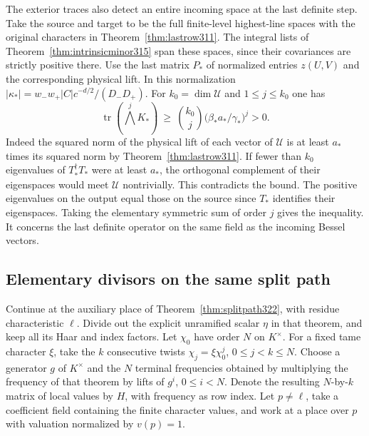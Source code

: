 \documentclass[a4paper,11pt]{article}
\theoremstyle{definition}
\theoremstyle{remark}
\numberwithin{equation}{section}
\begin{document}
The exterior traces also detect an entire incoming space at
the last definite step. Take the source and target to be the
full finite-level highest-line spaces with the original
characters in Theorem~\ref{thm:lastrow311}. The integral
lists of Theorem~\ref{thm:intrinsicminor315} span these
spaces, since their covariances are strictly positive there.
Use the last matrix \(P_*\) of normalized entries \(z(U,V)\)
and the corresponding physical lift. In this normalization
\(|\kappa_*|=w_-w_+|C|c^{-d/2}/(D_-D_+)\). For
\(k_0=\dim\mathcal U\) and \(1\le j\le k_0\) one has
\[
 \operatorname{tr}(\textstyle\bigwedge^j K_*)\ \ge\
        {k_0\choose j}\bigl(\beta_*a_*/\gamma_*\bigr)^j>0 .
\]
Indeed the squared norm of the physical lift of each vector
of \(\mathcal U\) is at least \(a_*\) times its squared norm
by Theorem~\ref{thm:lastrow311}. If fewer than \(k_0\)
eigenvalues of \(T_*^\dagger T_*\) were at least \(a_*\),
the orthogonal complement of their eigenspaces would meet
\(\mathcal U\) nontrivially. This contradicts the bound.
The positive eigenvalues on the output equal those on the
source since \(T_*\) identifies their eigenspaces. Taking
the elementary symmetric sum of order \(j\) gives the
inequality. It concerns the last definite operator on the
same field as the incoming Bessel vectors.

\subsection{Elementary divisors on the same split path}\label{nav:V-65}
Continue at the auxiliary place of Theorem~\ref{thm:splitpath322},
with residue characteristic \(\ell\). Divide out the explicit
unramified scalar \(\eta\) in that theorem, and keep all its
Haar and index factors. Let \(\chi_0\) have order \(N\) on
\(K^\times\). For a fixed tame character \(\xi\), take the
\(k\) consecutive twists \(\chi_j=\xi\chi_0^j\),
\(0\le j<k\le N\). Choose a generator \(g\) of \(K^\times\)
and the \(N\) terminal frequencies obtained by multiplying
the frequency of that theorem by lifts of \(g^i\),
\(0\le i<N\). Denote the resulting \(N\)-by-\(k\) matrix
of local values by \(H\), with frequency as row index.
Let \(p\ne\ell\), take a coefficient field containing the
finite character values, and work at a place over \(p\) with
valuation normalized by \(v(p)=1\).
\end{document}
